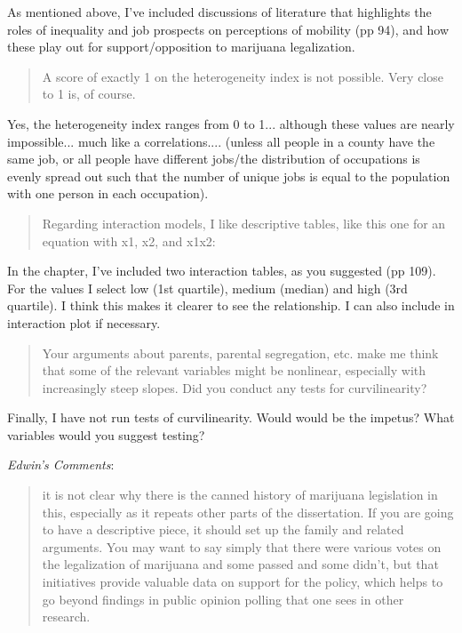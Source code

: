 \documentclass[12pt,stdletter,dateno,sigleft]{newlfm} %
\begin{document}
\begin{newlfm}
As mentioned above, I've included discussions of literature that highlights the roles of inequality and job prospects on perceptions of mobility (pp 94), and how these play out for support/opposition to marijuana legalization. 


\begin{quotation}{\color{red}\noindent \footnotesize
A score of exactly 1 on the heterogeneity index is not possible. Very close to 1 is, of course.
}
\end{quotation}


Yes, the heterogeneity index ranges from 0 to 1...  although these values are nearly impossible... much like a correlations.... (unless all people in a county have the same job, or all people have different jobs/the distribution of occupations is evenly spread out such that the number of unique jobs is equal to the population with one person in each occupation). 



\begin{quotation}{\color{red}\noindent \footnotesize
Regarding interaction models, I like descriptive tables, like this one for an equation with x1, x2, and x1x2:
}
\end{quotation}


In the chapter, I've included two interaction tables, as you suggested (pp 109). For the values I select low (1st quartile), medium (median) and high (3rd quartile). I think this makes it clearer to see the relationship. I can also include in interaction plot if necessary.


\begin{quotation}{\color{red}\noindent \footnotesize
Your arguments about parents, parental segregation, etc. make me think that some of the relevant variables might be nonlinear, especially with increasingly steep slopes. Did you conduct any tests for curvilinearity?
}
\end{quotation}

Finally, I have not run tests of curvilinearity. Would would be the impetus? What variables would you suggest testing? \newline


\textit{Edwin's Comments}:

\begin{quotation}{\color{red}\noindent \footnotesize
it is not clear why there is the canned history of marijuana legislation in this, especially as it repeats other parts of the dissertation. If you are going to have a descriptive piece, it should set up the family and related arguments.  You may want to say simply that there were various votes on the legalization of marijuana and some passed and some didn't, but that initiatives provide valuable data on support for the policy, which helps to go beyond findings in public opinion polling that one sees in other research.
}
\end{quotation}



\end{newlfm}
\end{document}
